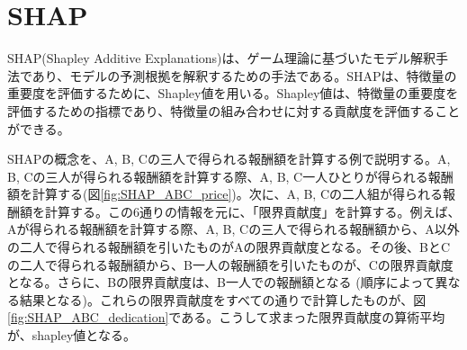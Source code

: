 \documentclass{ltjsarticle}
\begin{document}
\section{SHAP}
SHAP(Shapley Additive Explanations)は、ゲーム理論に基づいたモデル解釈手法であり、モデルの予測根拠を解釈するための手法である。SHAPは、特徴量の重要度を評価するために、Shapley値を用いる。Shapley値は、特徴量の重要度を評価するための指標であり、特徴量の組み合わせに対する貢献度を評価することができる。
\par
SHAPの概念を、A, B, Cの三人で得られる報酬額を計算する例で説明する。A, B, Cの三人が得られる報酬額を計算する際、A, B, C一人ひとりが得られる報酬額を計算する(図\ref{fig:SHAP_ABC_price})。次に、A, B, Cの二人組が得られる報酬額を計算する。この6通りの情報を元に、「限界貢献度」を計算する。例えば、Aが得られる報酬額を計算する際、A, B, Cの三人で得られる報酬額から、A以外の二人で得られる報酬額を引いたものがAの限界貢献度となる。その後、BとCの二人で得られる報酬額から、B一人の報酬額を引いたものが、Cの限界貢献度となる。さらに、Bの限界貢献度は、B一人での報酬額となる (順序によって異なる結果となる)。これらの限界貢献度をすべての通りで計算したものが、図\ref{fig:SHAP_ABC_dedication}である。こうして求まった限界貢献度の算術平均が、shapley値となる。
\end{document}
